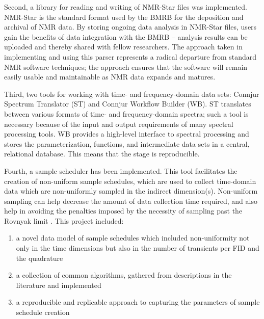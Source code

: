 \documentclass[a4paper]{report}
\begin{document}
Second, a library for reading and writing of NMR-Star files was implemented.  
NMR-Star is the standard format used by the BMRB for the deposition and 
archival of NMR data.  By storing ongoing data analysis in NMR-Star files, 
users gain the benefits of data integration with the BMRB -- analysis results 
can be uploaded and thereby shared with fellow researchers.  The approach 
taken in implementing and using this parser represents a radical departure 
from standard NMR software techniques; the approach ensures that the 
software will remain easily usable and maintainable as NMR data expands 
and matures.

Third, two tools for working with time- and frequency-domain data sets:  
Connjur Spectrum Translator (ST) and Connjur Workflow Builder (WB).  ST 
translates between various formats of time- and frequency-domain spectra; 
such a tool is necessary because of the input and output requirements of 
many spectral processing tools.  WB provides a high-level interface to 
spectral processing and stores the parameterization, functions, and 
intermediate data sets in a central, relational database.  This means 
that the stage is reproducible.

Fourth, a sample scheduler has been implemented.  This tool facilitates the 
creation of non-uniform sample schedules, which are used to collect time-domain 
data which are non-uniformly sampled in the indirect dimension(s).  Non-uniform 
sampling can help decrease the amount of data collection time required, and 
also help in avoiding the penalties imposed by the necessity of sampling past 
the Rovnyak limit \cite{rovnyak2004accelerated}.  This project included:
\begin{enumerate}
  \item a novel data model of sample schedules which included non-uniformity not 
only in the time dimensions but also in the number of transients per FID and 
the quadrature
  \item a collection of common algorithms, gathered from descriptions in the 
literature and implemented
  \item a reproducible and replicable approach to capturing the parameters of 
sample schedule creation
\end{enumerate}
\end{document}
